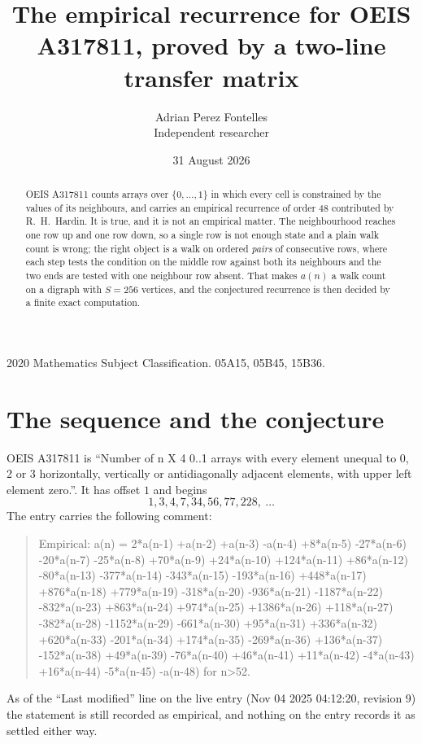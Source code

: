 \documentclass[11pt,a4paper]{article}
\title{The empirical recurrence for OEIS A317811, proved by a two-line transfer matrix}
\author{Adrian Perez Fontelles\\ \small Independent researcher}
\date{31 August 2026}
\theoremstyle{plain}
\theoremstyle{definition}
\begin{document}
\maketitle

\begin{abstract}
OEIS A317811 counts arrays over $\{0,\dots,1\}$ in which every cell is constrained by the
values of its neighbours, and carries an empirical recurrence of order $48$ contributed
by R.~H.~Hardin. It is true, and it is not an empirical matter. The neighbourhood reaches one
row up and one row down, so a single row is not enough state and a plain walk count
is wrong; the right object is a walk on ordered \emph{pairs} of consecutive rows, where
each step tests the condition on the middle row against both its neighbours and the two
ends are tested with one neighbour row absent. That makes $a(n)$ a walk count on a digraph
with $S=256$ vertices, and the conjectured recurrence is then decided by a finite exact
computation.
\end{abstract}

\noindent\small 2020 Mathematics Subject Classification. 05A15, 05B45, 15B36.\normalsize

\section{The sequence and the conjecture}

OEIS A317811 is ``Number of n X 4 0..1 arrays with every element unequal to 0, 2 or 3 horizontally, vertically or antidiagonally adjacent elements, with upper left element zero.''. It has offset $1$ and begins
\[
1, 3, 4, 7, 34, 56, 77, 228,\ \dots
\]
The entry carries the following comment:
\begin{quote}\small
Empirical: a(n) = 2*a(n-1) +a(n-2) +a(n-3) -a(n-4) +8*a(n-5) -27*a(n-6) -20*a(n-7) -25*a(n-8) +70*a(n-9) +24*a(n-10) +124*a(n-11) +86*a(n-12) -80*a(n-13) -377*a(n-14) -343*a(n-15) -193*a(n-16) +448*a(n-17) +876*a(n-18) +779*a(n-19) -318*a(n-20) -936*a(n-21) -1187*a(n-22) -832*a(n-23) +863*a(n-24) +974*a(n-25) +1386*a(n-26) +118*a(n-27) -382*a(n-28) -1152*a(n-29) -661*a(n-30) +95*a(n-31) +336*a(n-32) +620*a(n-33) -201*a(n-34) +174*a(n-35) -269*a(n-36) +136*a(n-37) -152*a(n-38) +49*a(n-39) -76*a(n-40) +46*a(n-41) +11*a(n-42) -4*a(n-43) +16*a(n-44) -5*a(n-45) -a(n-48) for n>52.
\end{quote}
As of the ``Last modified'' line on the live entry (Nov 04 2025 04:12:20, revision 9) the statement is
still recorded as empirical, and nothing on the entry records it as settled either way.
\end{document}
